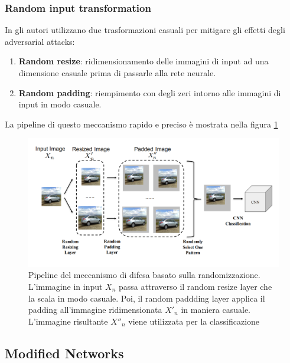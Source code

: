         \subsubsection{Random input transformation}
        In %
        \cite{xie2017mitigating} gli autori utilizzano due trasformazioni casuali per mitigare gli effetti degli adversarial attacks:
            \begin{enumerate}
                \item \textbf{Random resize}: ridimensionamento delle immagini di input ad una dimensione casuale prima di passarle alla rete neurale. 
                \item \textbf{Random padding}: riempimento con degli zeri intorno alle immagini di input in modo casuale.
            \end{enumerate}
        La pipeline di questo meccanismo rapido e preciso è mostrata nella figura \ref{Random resize and padding}
            \begin{figure} [!h]
                \centering \includegraphics[width=\textwidth]{Images/Mitigation/Random resize and padding.png}
                \caption{Pipeline del meccanismo di difesa basato sulla randomizzazione. L'immagine in input $X_n$ passa attraverso il random resize layer che la scala in modo casuale. Poi, il random paddding layer applica il padding all'immagine ridimensionata $X'_n$ in maniera casuale. L'immagine risultante $X''_n$ viene utilizzata per la classificazione}
                \label{Random resize and padding}
            \end{figure}
    \newpage
    
    
    
    \subsection{Modified Networks}
        
